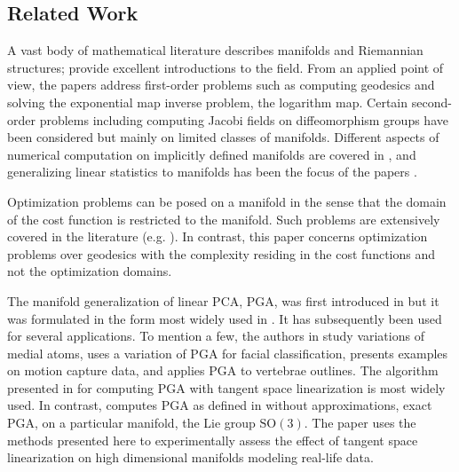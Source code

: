 \documentclass[final]{svjour3}
\begin{document}
\subsection{Related Work}
\label{sec:related}
A vast body of mathematical literature describes manifolds and Riemannian
structures; 
\cite{do_carmo_riemannian_1992,lee_riemannian_1997} provide
excellent introductions to the field. From an applied point of view, the papers
\cite{dedieu_symplectic_2005,herbert_bishop_keller_numerical_1968,noakes_global_1998,klassen_geodesics_2006,schmidt_shape_2006,sommer_bicycle_2009}
address first-order problems such as computing geodesics and solving the
exponential map inverse problem, the logarithm map.
Certain second-order problems including computing Jacobi fields on
diffeomorphism groups \cite{younes_evolutions_2009,ferreira_newton_2008}
have been considered but mainly on limited classes of manifolds. 
Different aspects of numerical computation on implicitly defined manifolds are covered in
\cite{zhang_curvature_2007,rheinboldt_manpak:_1996,rabier_computational_1990},
and generalizing linear statistics to manifolds has been the focus of the papers
\cite{karcher_riemannian_1977,pennec_intrinsic_2006,fletcher_robust_2008,fletcher_principal_2004-1,huckemann_intrinsic_2010}.

Optimization problems can be posed on a manifold in the sense that the domain of
the cost function is restricted to the manifold.
Such problems are extensively covered in the literature 
(e.g. \cite{luenberger_gradient_1972,yang_globally_2007}). In contrast, this
paper concerns
optimization problems over geodesics with the complexity residing in 
the cost functions and not the optimization
domains.

The manifold generalization of linear PCA, PGA, was first introduced in
\cite{fletcher_statistics_2003} but it was formulated in the form most widely used in
\cite{fletcher_principal_2004-1}. It has subsequently been used for several
applications. To mention a few, the authors in 
\cite{fletcher_principal_2004-1,fletcher_principal_2004} study
variations of medial atoms, \cite{wu_weighted_2008} uses a variation
of PGA for facial classification, \cite{said_exact_2007} presents examples on
motion capture data, and \cite{sommer_bicycle_2009} applies PGA to vertebrae
outlines. 
The algorithm presented in \cite{fletcher_principal_2004-1} for computing PGA with tangent space
linearization is most widely used. 
In contrast, \cite{said_exact_2007} computes PGA as
defined in \cite{fletcher_statistics_2003} without approximations, exact PGA, on
a particular 
manifold, the Lie group $\mathrm{SO}(3)$. The paper
\cite{sommer_manifold_2010} uses the methods presented here to experimentally
assess the effect of tangent space linearization
on high dimensional manifolds modeling real-life
data.
\end{document}

